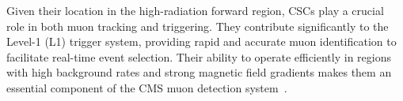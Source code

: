 Given their location in the high-radiation forward region, CSCs play a crucial role in both muon tracking and triggering. They contribute significantly to the Level-1 (L1) trigger system, providing rapid and accurate muon identification to facilitate real-time event selection. Their ability to operate efficiently in regions with high background rates and strong magnetic field gradients makes them an essential component of the CMS muon detection system~\cite{CMS:MuonTDR, CMS_Collaboration_2010, Pozzobon:2701333}.







